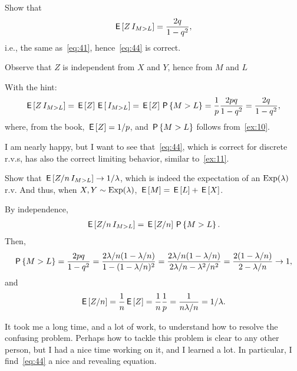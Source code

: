 \documentclass[a4paper,11pt]{article}
\begin{document}
\begin{exercise}
Show that
\begin{equation}
  \label{eq:45}
\E{Z\1{M>L}} = \frac{2q} {1-q^{2}},
\end{equation}
i.e., the same as~\cref{eq:41}, hence~\cref{eq:44} is correct.
\begin{hint}
Observe that $Z$   is independent from $X$ and $Y$, hence from $M$ and $L$
\end{hint}
\begin{solution} With the hint:
  \begin{align}
    \label{eq:46}
\E{Z\1{M>L}}  = \E Z \E{\1{M>L}} = \E Z \P{M>L} = \frac 1 p \frac{2pq}{1-q^{2}} = \frac{2q}{1-q^{2}},
  \end{align}
where, from the book, $\E Z = 1/p$, and $\P{M>L}$ follows from~\cref{ex:10}.
\end{solution}
\end{exercise}


I am nearly happy, but I want to see that~\eqref{eq:44}, which is correct for discrete r.v.s, has also the correct limiting behavior, similar to~\cref{ex:11}.
\begin{exercise}
Show that $\E{Z/n\1{M>L}} \to 1/\lambda$, which is indeed the expectation of an $\Exp{\lambda}$ r.v. And thus, when $X,Y\sim \Exp{\lambda}$, $\E M = \E L + \E X$.
\begin{solution}
By independence,
  \begin{align}
    \label{eq:47}
\E{Z/n\1{M>L}} = \E{Z/n} \P{M>L}.
  \end{align}
Then,
\begin{align}
  \label{eq:49}
\P{M>L}   = \frac{2pq}{1-q^{2}}
= \frac{2\lambda/n (1-\lambda/n)}{1-(1-\lambda/n)^{2}}
= \frac{2\lambda/n (1-\lambda/n)}{2\lambda/n -\lambda^{2}/n^{2}}
= \frac{2 (1-\lambda/n)}{2 -\lambda/n}  \to 1,
\end{align}
and
\begin{align}
  \label{eq:50}
\E{Z/n} = \frac 1 n \E Z = \frac 1 n \frac 1 p = \frac 1 {n \lambda/ n} = 1/\lambda.
\end{align}
\end{solution}

\end{exercise}

It took me a long time, and a lot of work, to understand how to resolve the confusing problem.
Perhaps how to tackle this problem is clear to any other person, but I had a nice time working on it, and I learned a lot.
In particular, I find~\cref{eq:44} a nice and revealing equation.
\end{document}
